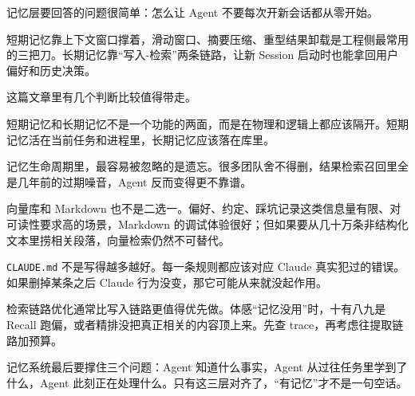 \documentclass[10pt,a4paper]{ctexart}
\begin{document}
记忆层要回答的问题很简单：怎么让 Agent 不要每次开新会话都从零开始。



短期记忆靠上下文窗口撑着，滑动窗口、摘要压缩、重型结果卸载是工程侧最常用的三把刀。长期记忆靠“写入-检索”两条链路，让新 Session 启动时也能拿回用户偏好和历史决策。



这篇文章里有几个判断比较值得带走。



短期记忆和长期记忆不是一个功能的两面，而是在物理和逻辑上都应该隔开。短期记忆活在当前任务和进程里，长期记忆应该落在库里。



记忆生命周期里，最容易被忽略的是遗忘。很多团队舍不得删，结果检索召回里全是几年前的过期噪音，Agent 反而变得更不靠谱。



向量库和 Markdown 也不是二选一。偏好、约定、踩坑记录这类信息量有限、对可读性要求高的场景，Markdown 的调试体验很好；但如果要从几十万条非结构化文本里捞相关段落，向量检索仍然不可替代。



\texttt{CLAUDE.md} 不是写得越多越好。每一条规则都应该对应 Claude 真实犯过的错误。如果删掉某条之后 Claude 行为没变，那它可能从来就没起作用。



检索链路优化通常比写入链路更值得优先做。体感“记忆没用”时，十有八九是 Recall 跑偏，或者精排没把真正相关的内容顶上来。先查 trace，再考虑往提取链路加预算。



记忆系统最后要撑住三个问题：Agent 知道什么事实，Agent 从过往任务里学到了什么，Agent 此刻正在处理什么。只有这三层对齐了，“有记忆”才不是一句空话。
\end{document}
